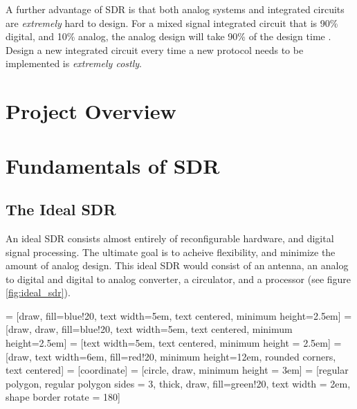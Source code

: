 \documentclass[a4paper, 12pt]{article}
\begin{document}
A further advantage of SDR is that both analog systems and integrated circuits are \textit{extremely} hard to design.  For a mixed signal integrated circuit that is 90\% digital, and 10\% analog, the analog design will take 90\% of the design time \cite{ana_why}.  Design a new integrated circuit every time a new protocol needs to be implemented is \textit{extremely costly}.


\section{Project Overview}


\section{Fundamentals of SDR}
\label{sec:sdr_funadamentals}
\subsection{The Ideal SDR}
\label{sec:ideal_sdr}
An ideal SDR consists almost entirely of reconfigurable hardware, and digital signal processing. The ultimate goal is to acheive flexibility, and minimize the amount of analog design.  This ideal SDR would consist of an antenna, an analog to digital and digital to analog converter, a circulator, and a processor (see figure \ref{fig:ideal_sdr}).


 = [draw, fill=blue!20, text width=5em, 
    text centered, minimum height=2.5em]
 = [draw, draw, fill=blue!20, text width=5em, 
    text centered, minimum height=2.5em]
 = [text width=5em, text centered, minimum height = 2.5em]
 = [draw, text width=6em, fill=red!20, 
    minimum height=12em, rounded corners, text centered]
 = [coordinate]
 = [circle, draw, minimum height = 3em]
 = [regular polygon, regular polygon sides = 3, thick, draw, fill=green!20, text width = 2em, shape border rotate = 180]


\def\blockdist{2.3}
\def\edgedist{2.5}
\end{document}
